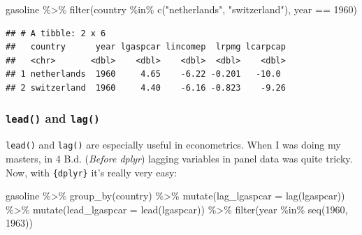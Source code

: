 \documentclass[
]{article}
\newenvironment{Shaded}{\begin{snugshade}}{\end{snugshade}}
\newcommand{\AttributeTok}[1]{\textcolor[rgb]{0.77,0.63,0.00}{#1}}
\newcommand{\DecValTok}[1]{\textcolor[rgb]{0.00,0.00,0.81}{#1}}
\newcommand{\FunctionTok}[1]{\textcolor[rgb]{0.00,0.00,0.00}{#1}}
\newcommand{\NormalTok}[1]{#1}
\newcommand{\SpecialCharTok}[1]{\textcolor[rgb]{0.00,0.00,0.00}{#1}}
\newcommand{\StringTok}[1]{\textcolor[rgb]{0.31,0.60,0.02}{#1}}
\begin{document}
\begin{Shaded}
\begin{Highlighting}[]
\NormalTok{gasoline }\SpecialCharTok{\%\textgreater{}\%}
  \FunctionTok{filter}\NormalTok{(country }\SpecialCharTok{\%in\%} \FunctionTok{c}\NormalTok{(}\StringTok{"netherlands"}\NormalTok{, }\StringTok{"switzerland"}\NormalTok{), year }\SpecialCharTok{==} \DecValTok{1960}\NormalTok{)}
\end{Highlighting}
\end{Shaded}

\begin{verbatim}
## # A tibble: 2 x 6
##   country      year lgaspcar lincomep  lrpmg lcarpcap
##   <chr>       <dbl>    <dbl>    <dbl>  <dbl>    <dbl>
## 1 netherlands  1960     4.65    -6.22 -0.201   -10.0 
## 2 switzerland  1960     4.40    -6.16 -0.823    -9.26
\end{verbatim}

\hypertarget{lead-and-lag}{%
\subsubsection{\texorpdfstring{\texttt{lead()} and \texttt{lag()}}{lead() and lag()}}\label{lead-and-lag}}

\texttt{lead()} and \texttt{lag()} are especially useful in econometrics. When I was doing my masters, in 4 B.d.
(\emph{Before dplyr}) lagging variables in panel data was quite tricky. Now, with \texttt{\{dplyr\}} it's really
very easy:

\begin{Shaded}
\begin{Highlighting}[]
\NormalTok{gasoline }\SpecialCharTok{\%\textgreater{}\%}
  \FunctionTok{group\_by}\NormalTok{(country) }\SpecialCharTok{\%\textgreater{}\%}
  \FunctionTok{mutate}\NormalTok{(}\AttributeTok{lag\_lgaspcar =} \FunctionTok{lag}\NormalTok{(lgaspcar)) }\SpecialCharTok{\%\textgreater{}\%}
  \FunctionTok{mutate}\NormalTok{(}\AttributeTok{lead\_lgaspcar =} \FunctionTok{lead}\NormalTok{(lgaspcar)) }\SpecialCharTok{\%\textgreater{}\%}
  \FunctionTok{filter}\NormalTok{(year }\SpecialCharTok{\%in\%} \FunctionTok{seq}\NormalTok{(}\DecValTok{1960}\NormalTok{, }\DecValTok{1963}\NormalTok{))}
\end{Highlighting}
\end{Shaded}
\end{document}
